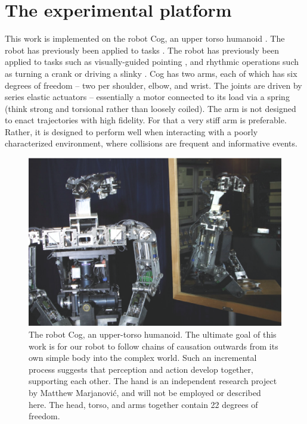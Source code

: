 
\section{The experimental platform}

This work is implemented on the robot Cog, an upper torso humanoid
\ifrev
\cite{brooks99cog, group-IEEE-2000}.  The robot has previously been applied to tasks
\else
\cite{brooks99cog}.  The robot has previously been applied to tasks
\fi
such as visually-guided pointing \cite{Marjanovic-96-SAB}, and
rhythmic operations such as turning a crank or driving a slinky
\cite{williamson98neural}.  Cog has two arms, each of which has six
degrees of freedom -- two per shoulder, elbow, and wrist.  The joints
are driven by series elastic actuators \cite{williamson95series} --
essentially a motor connected to its load via a spring (think strong
and torsional rather than loosely coiled).  The arm is not designed to
enact trajectories with high fidelity.  For that a very stiff arm is
preferable.  Rather, it is designed to perform well when interacting
with a poorly characterized environment, where collisions are frequent
and informative events.

\begin{figure}[tbh]
\centerline{
\includegraphics[width=12cm]{mirror-cog.eps}
}
\caption{ 
%
  The robot Cog, an upper-torso humanoid.  
The ultimate goal of this work is for our robot to follow chains of
causation outwards from its own simple body into the complex world.
Such an incremental process suggests that perception and action
develop together, supporting each other.
\ifverbose
The hand
  is an independent research project by Matthew Marjanovi\'{c}, and
  will not be employed or described here.  
\fi
  The head, torso, and arms
  together contain 22 degrees of freedom.
%
}
\label{fig:cog-schematic}
\end{figure}


